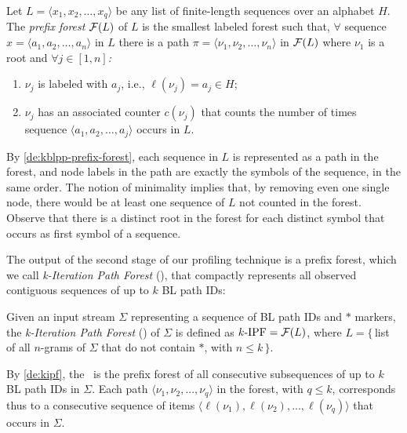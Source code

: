 \begin{definition}
\label{de:kblpp-prefix-forest}
Let $L=\langle x_1, x_2, \ldots, x_q\rangle$ be any list of finite-length sequences over an alphabet $H$. The {\em prefix forest} ${\cal F}(L)$ of $L$ is the smallest labeled forest such that, $\forall$ sequence $x=\langle a_1, a_2, \ldots, a_n\rangle$ in $L$ there is a path $\pi=\langle \nu_1, \nu_2, \ldots, \nu_n\rangle$ in ${\cal F}(L)$ where $\nu_1$ is a root and $\forall j\in[1,n]${\em :}
\begin{enumerate}
\item $\nu_j$ is labeled with $a_j$, i.e., $\ell(\nu_j)=a_j\in H$;
\item $\nu_j$ has an associated counter $c(\nu_j)$ that counts the number of times sequence $\langle a_1, a_2, \ldots, a_j\rangle$ occurs in $L$.
\end{enumerate}
\end{definition}

\noindent By \mydefinition\ref{de:kblpp-prefix-forest}, each sequence in $L$ is represented as a path in the forest, and node labels in the path are exactly the symbols of the sequence, in the same order. The notion of minimality implies that, by removing even one single node, there would be at least one sequence of $L$ not counted in the forest. Observe that there is a distinct root in the forest for each distinct symbol that occurs as first symbol of a sequence.

The output of the second stage of our profiling technique is a prefix forest, which we call {\em k-Iteration Path Forest} (\kipf), that compactly represents all observed contiguous sequences of up to $k$ BL path IDs:

\begin{definition}
\label{de:kipf}
Given an input stream $\Sigma$ representing a sequence of BL path IDs and $*$ markers, the {\em k-Iteration Path Forest} (\kipf) of $\Sigma$ is defined as $\mbox{$k$-IPF}={\cal F}(L)$, where $L=\{$\,list of all $n$-grams of $\Sigma$ that do not contain $*$, with $n\le k\,\}$.
\end{definition}

\noindent By \mydefinition\ref{de:kipf}, the \kipf\ is the prefix forest of all consecutive subsequences of up to $k$ BL path IDs in $\Sigma$. Each path $\langle\nu_1, \nu_2, ..., \nu_q\rangle$ in the forest, with $q\le k$, corresponds thus to a consecutive sequence of items $\langle\ell(\nu_1), \ell(\nu_2), ..., \ell(\nu_q)\rangle$ that occurs in $\Sigma$.

